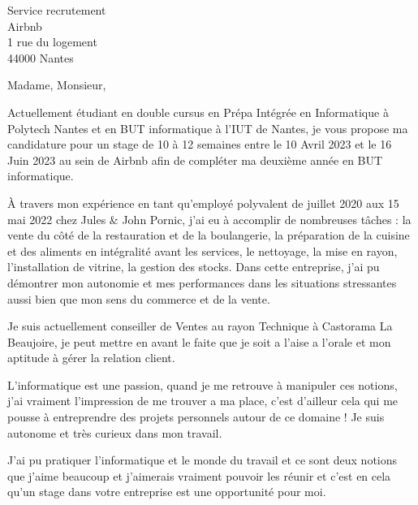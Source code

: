 \documentclass[
    french,
    sender,
    paper=a4,
    version=last,
    fontsize=9pt,
    DIV=12,
    BCOR=0mm
]{scrlttr2}
\begin{document}




\begin{letter}{
    Service recrutement\\
    Airbnb\\
    1 rue du logement\\
    44000 Nantes
}

\opening{Madame, Monsieur,}


Actuellement étudiant en double cursus en Prépa Intégrée en Informatique à Polytech Nantes et en BUT informatique à l’IUT de Nantes, je vous propose ma candidature pour un stage de 10 à 12 semaines entre le 10 Avril 2023 et le 16 Juin 2023 au sein de Airbnb afin de compléter ma deuxième année en BUT informatique. 

À travers mon expérience en tant qu’employé polyvalent de juillet 2020 aux 15 mai 2022 chez Jules \& John Pornic, j’ai eu à accomplir de nombreuses tâches : la vente du côté de la restauration et de la boulangerie, la préparation de la cuisine et des aliments en intégralité avant les services, le nettoyage, la mise en rayon, l’installation de vitrine, la gestion des stocks. Dans cette entreprise, j’ai pu démontrer mon autonomie et mes performances dans les situations stressantes aussi bien que mon sens du commerce et de la vente.

Je suis actuellement conseiller de Ventes au rayon Technique à Castorama La Beaujoire, je peut mettre en avant le faite que je soit a l'aise a l'orale et mon aptitude à gérer la relation client.

L’informatique est une passion, quand je me retrouve à manipuler ces notions, j’ai vraiment l'impression de me trouver a ma place, c’est d’ailleur cela qui me pousse à entreprendre des projets personnels autour de ce domaine ! Je suis autonome et très curieux  dans mon travail.

J’ai pu pratiquer l’informatique et le monde du travail et ce sont deux notions que j’aime beaucoup et j’aimerais vraiment pouvoir les réunir et c’est en cela qu’un stage dans votre entreprise est une opportunité pour moi.


\end{letter}
\end{document}
